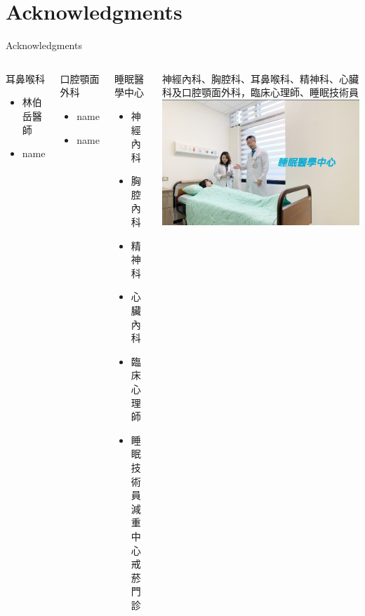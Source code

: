 \documentclass[aspectratio=169]{beamer}
\begin{document}
\section{Acknowledgments}
\begin{frame}{Acknowledgments}

\begin{columns}[onlytextwidth]

\begin{block}{耳鼻喉科}
\begin{itemize}
\vskip0.5cm
\item 林伯岳醫師 
\vskip0.5cm
\item name 
\end{itemize}
\vskip1.7cm
~
\end{block}
\vskip1cm 

\begin{block}{口腔顎面外科}
\vskip0.5cm 
\begin{itemize}
\item name
\vskip0.5cm
\item name 
\end{itemize}
\vskip1.7cm
~
\end{block}

\begin{block}{睡眠醫學中心}
\vskip0.5cm 
\begin{itemize}
\item 神經內科 
\vskip0.5cm
\item 胸腔內科 
\vskip0.5cm
\item 精神科
\vskip0.5cm
\item 心臟內科
\vskip0.5cm
\item 臨床心理師
\vskip0.5cm
\item 睡眠技術員
\vskip0.5cm
減重中心
\vskip0.5cm
戒菸門診
\end{itemize}

\end{block}
\vskip1cm
\begin{block}{神經內科、胸腔科、耳鼻喉科、精神科、心臟科及口腔顎面外科，臨床心理師、睡眠技術員}
\includegraphics[height=0.4\textheight]{CostUnitImage1202104151044255.jpg}%
\end{block}
\end{columns}


\end{frame}

\begin{frame}[label={lastframe}]
\end{frame}

\end{document}
